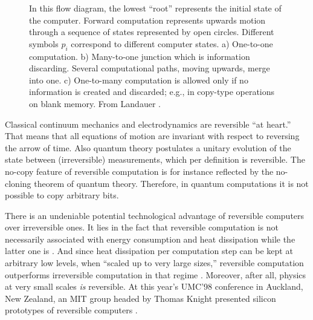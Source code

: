 \begin{figure}
\begin{center}
\begin{picture}
\end{picture}
\end{center}
\caption{In this flow diagram, the lowest ``root'' represents the
initial state of the computer. Forward computation represents
upwards motion
through a sequence of states represented by open circles. Different
symbols $p_i$ correspond to different computer states.
a) One-to-one computation.
b) Many-to-one junction which is information discarding. Several
computational paths, moving upwards, merge into one.
c) One-to-many computation is allowed only
 if no information is
created and discarded; e.g., in copy-type operations on blank memory.
From Landauer \protect\cite{landauer-94}.
\label{f-rev-comp}
}
\end{figure}


Classical continuum mechanics and electrodynamics are reversible
``at heart.'' That means that all  equations of motion are invariant
with
respect to reversing the arrow of time. Also quantum theory
postulates a unitary evolution of the state between (irreversible)
measurements, which per definition is reversible.
The
no-copy feature of reversible computation is for instance reflected by
the no-cloning theorem of quantum theory.
Therefore, in quantum computations it is not possible to copy arbitrary
bits.


There is an undeniable potential technological advantage
of reversible computers over irreversible ones. It lies in the fact that
reversible computation is not necessarily associated with energy
consumption and heat dissipation while the latter one is
\cite{maxwell-demon}.
And since heat dissipation per computation step can be kept at arbitrary
low levels, when ``scaled up to very large sizes,'' reversible
computation outperforms irreversible computation in that
regime \cite{fr-kn-mar}.
Moreover, after all, physics at very small scales {\it is} reversible.
At this year's UMC'98 conference in Auckland, New Zealand,
an MIT group headed by Thomas Knight presented silicon prototypes of
reversible computers \cite{fr-kn-mar2,kn-su,vieri}.

